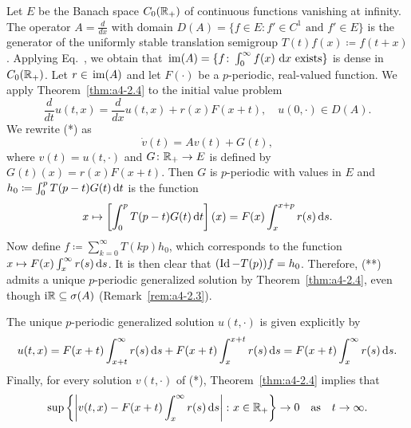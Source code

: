 \begin{example}\label{ex:a4-2.5}
Let $E$ be the Banach space $C_{0}(\mathbb{R}_{+})$ of continuous functions vanishing at infinity.
The operator $A = \frac{d}{dx}$ with domain $D(A) = \{f \in E: f' \in C^{1} \text{ and } f' \in E\}$ is the generator of the uniformly stable translation semigroup $T(t)f(x) \coloneq f(t+x)$. 
Applying Eq.~, we obtain that $\mathop{}\mathrm{im}(A) = \{f\colon\int_{0}^{\infty} f(x) \,\mathop{}\!\mathrm{d}{x} \text{ exists}\}$ is dense in $C_{0}(\mathbb{R}_{+})$. 
Let $r \in \mathop{}\mathrm{im}(A)$ and let $F(\cdot)$ be a $p$-periodic, real-valued function.
We apply Theorem~\ref{thm:a4-2.4}  to the initial value problem
\begin{equation}
 \frac{d}{dt} u(t,x) = \frac{d}{dx}u(t,x) + r(x)F(x+t), \quad u(0,\cdot) \in D(A). 
 \tag{*}
\end{equation}
We rewrite (*) as  
\begin{equation}
\dot{v}(t) = Av(t) + G(t), \tag{**}
\end{equation}
where $v(t) = u(t,\cdot)$ and $G\colon\mathbb{R}_{+} \to E$ is defined by $G(t)(x) = r(x)F(x+t)$.
Then $G$ is $p$-periodic with values in $E$ and $h_{0} \coloneq \int_{0}^{p} T(p-t)G(t)  \mathop{}\!\mathrm{d}{t}$ is the function 
%
\[
	x \mapsto \left[\int_{0}^{p} T(p-t)G(t)  \mathop{}\!\mathrm{d}{t}\right](x) = F(x)\int_{x}^{x+p} r(s)  \mathop{}\!\mathrm{d}{s} .
\]
%
Now define $f \coloneq  \sum_{k=0}^{\infty} T(kp)h_{0}$, which corresponds to the function $x \mapsto F(x)\int_{x}^{\infty} r(s)  \mathop{}\!\mathrm{d}{s}$. It is then clear that $(\operatorname{Id} - T(p))f = h_{0}$. 
Therefore, (**) admits a unique $p$-periodic generalized solution by Theorem~\ref{thm:a4-2.4}, even though $\mathrm{i} \mathbb{R} \subseteq \sigma(A)$ (\cf Remark~\ref{rem:a4-2.3}).

The unique $p$-periodic generalized solution $u(t,\cdot)$ is given explicitly by 
\[
u(t,x) = F(x+t)\int_{x+t}^{\infty} r(s) \mathop{}\!\mathrm{d}{s} + F(x+t)\int_{x}^{x+t} r(s) \mathop{}\!\mathrm{d}{s} = F(x+t)\int_{x}^{\infty} r(s) \mathop{}\!\mathrm{d}{s}.
\]
Finally, for every solution $v(t,\cdot)$ of (*), Theorem~\ref{thm:a4-2.4} implies that
\[
\sup\left\{\left|v(t,x) - F(x+t)\int_{x}^{\infty} r(s)  \mathop{}\!\mathrm{d}{s}\right| \colon x \in \mathbb{R}_{+}\right\} \to 0 \quad \text{as} \quad t \to \infty .
\]
\end{example}
